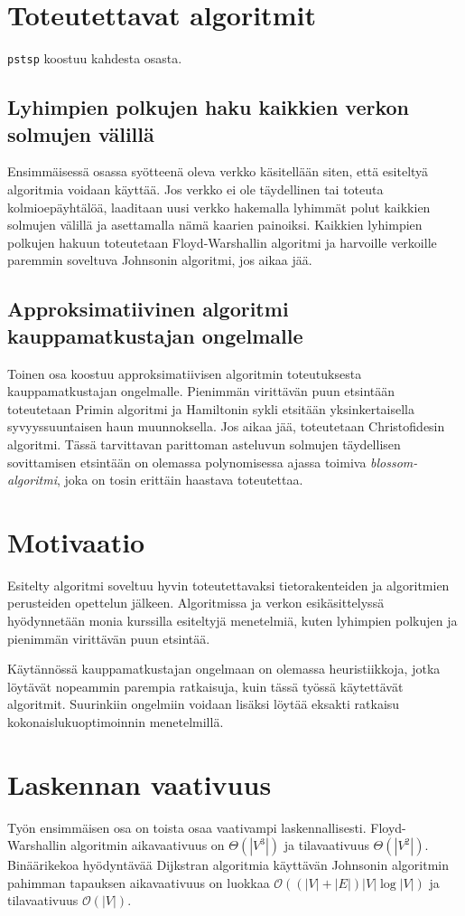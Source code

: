 \documentclass[a4paper]{scrartcl}
\begin{document}
\section{Toteutettavat algoritmit}
\texttt{pstsp} koostuu kahdesta osasta.

\subsection{Lyhimpien polkujen haku kaikkien verkon solmujen välillä}
Ensimmäisessä osassa syötteenä oleva verkko käsitellään siten,
että esiteltyä algoritmia voidaan käyttää. Jos verkko
ei ole täydellinen tai toteuta kolmioepäyhtälöä, laaditaan uusi verkko
hakemalla lyhimmät polut kaikkien solmujen välillä ja asettamalla nämä
kaarien painoiksi. Kaikkien lyhimpien polkujen hakuun toteutetaan
Floyd-Warshallin algoritmi\cite{fw} ja harvoille verkoille paremmin
soveltuva Johnsonin algoritmi\cite{jo},
jos aikaa jää.

\subsection{Approksimatiivinen algoritmi kauppamatkustajan ongelmalle}
Toinen osa koostuu approksimatiivisen algoritmin toteutuksesta
kauppamatkustajan ongelmalle. Pienimmän virittävän puun etsintään
toteutetaan Primin algoritmi\cite{pr} ja Hamiltonin sykli etsitään
yksinkertaisella syvyyssuuntaisen haun muunnoksella. Jos aikaa jää,
toteutetaan Christofidesin algoritmi. Tässä tarvittavan 
parittoman asteluvun solmujen täydellisen
sovittamisen etsintään on olemassa polynomisessa ajassa toimiva
\emph{blossom-algoritmi}\cite{bl}, joka on tosin erittäin haastava
toteutettaa.

\section{Motivaatio}
Esitelty algoritmi soveltuu hyvin toteutettavaksi tietorakenteiden ja
algoritmien perusteiden opettelun jälkeen. Algoritmissa ja verkon
esikäsittelyssä hyödynnetään monia kurssilla esiteltyjä menetelmiä,
kuten lyhimpien polkujen ja pienimmän virittävän puun etsintää.

Käytännössä kauppamatkustajan ongelmaan on olemassa heuristiikkoja,
jotka löytävät nopeammin parempia ratkaisuja, kuin tässä työssä
käytettävät algoritmit.\cite{wi} Suurinkiin ongelmiin voidaan lisäksi löytää
eksakti ratkaisu kokonaislukuoptimoinnin menetelmillä.

\section{Laskennan vaativuus}
Työn ensimmäisen osa on toista osaa vaativampi laskennallisesti.
Floyd-Warshallin algoritmin aikavaativuus on
$\Theta(|V^3|)$ ja tilavaativuus $\Theta(|V^2|)$.
Binäärikekoa hyödyntävää Dijkstran algoritmia\cite{di} käyttävän Johnsonin
algoritmin pahimman tapauksen aikavaativuus on luokkaa
$\mathcal{O}((|V|+|E|)|V|\log|V|)$ ja tilavaativuus $\mathcal{O}(|V|)$. 
\end{document}
